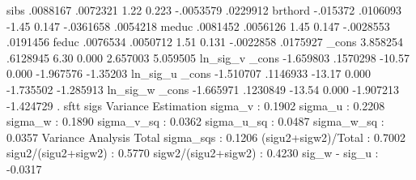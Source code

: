          sibs {\VBAR}   .0088167   .0072321     1.22   0.223    -.0053579    .0229912
       brthord {\VBAR}   -.015372   .0106093    -1.45   0.147    -.0361658    .0054218
         meduc {\VBAR}   .0081452   .0056126     1.45   0.147    -.0028553    .0191456
         feduc {\VBAR}   .0076534   .0050712     1.51   0.131    -.0022858    .0175927
         _cons {\VBAR}   3.858254   .6128945     6.30   0.000     2.657003    5.059505
ln_sig_v       {\VBAR}
         _cons {\VBAR}  -1.659803   .1570298   -10.57   0.000    -1.967576    -1.35203
ln_sig_u       {\VBAR}
         _cons {\VBAR}  -1.510707   .1146933   -13.17   0.000    -1.735502   -1.285913
ln_sig_w       {\VBAR}
         _cons {\VBAR}  -1.665971   .1230849   -13.54   0.000    -1.907213   -1.424729
{\smallskip}
. sftt sigs
{\smallskip}
               Variance Estimation          
sigma_v    :       0.1902
sigma_u    :       0.2208
sigma_w    :       0.1890
sigma_v_sq :       0.0362
sigma_u_sq :       0.0487
sigma_w_sq :       0.0357
               Variance Analysis          
Total sigma_sqs     :  0.1206
(sigu2+sigw2)/Total :  0.7002
sigu2/(sigu2+sigw2) :  0.5770
sigw2/(sigu2+sigw2) :  0.4230
sig_w - sig_u       : -0.0317
